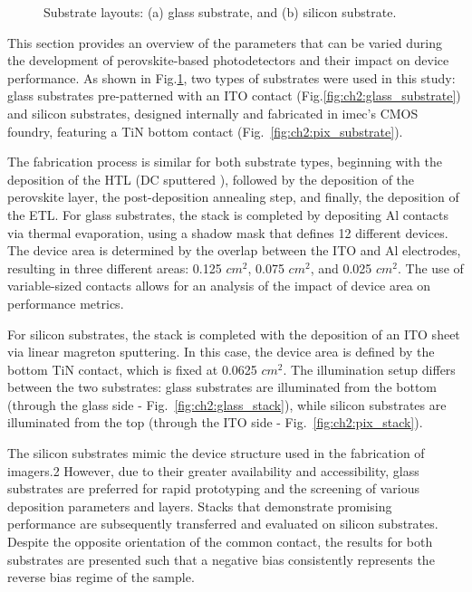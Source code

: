 \begin{figure}[htbp]
    \caption{Substrate layouts: (a) glass substrate, and (b) silicon substrate.}
    \label{fig:ch2:types_of_substrates}
\end{figure}


This section provides an overview of the parameters that can be varied during the development of perovskite-based photodetectors and their impact on device performance. As shown in Fig.\ref{fig:ch2:types_of_substrates}, two types of substrates were used in this study: glass substrates pre-patterned with an ITO contact (Fig.\ref{fig:ch2:glass_substrate}) and silicon substrates, designed internally and fabricated in imec's CMOS foundry, featuring a TiN bottom contact (Fig.~\ref{fig:ch2:pix_substrate}).

The fabrication process is similar for both substrate types, beginning with the deposition of the HTL (DC sputtered ), followed by the deposition of the perovskite layer, the post-deposition annealing step, and finally, the deposition of the ETL. For glass substrates, the stack is completed by depositing Al contacts via thermal evaporation, using a shadow mask that defines 12 different devices. The device area is determined by the overlap between the ITO and Al electrodes, resulting in three different areas: 0.125 $cm^2$, 0.075 $cm^2$, and 0.025 $cm^2$. The use of variable-sized contacts allows for an analysis of the impact of device area on performance metrics.

For silicon substrates, the stack is completed with the deposition of an ITO sheet via linear magreton sputtering. In this case, the device area is defined by the bottom TiN contact, which is fixed at 0.0625 $cm^2$. The illumination setup differs between the two substrates: glass substrates are illuminated from the bottom (through the glass side - Fig.~\ref{fig:ch2:glass_stack}), while silicon substrates are illuminated from the top (through the ITO side - Fig.~\ref{fig:ch2:pix_stack}). 

The silicon substrates mimic the device structure used in the fabrication of imagers.2 However, due to their greater availability and accessibility, glass substrates are preferred for rapid prototyping and the screening of various deposition parameters and layers. Stacks that demonstrate promising performance are subsequently transferred and evaluated on silicon substrates. Despite the opposite orientation of the common contact, the results for both substrates are presented such that a negative bias consistently represents the reverse bias regime of the sample.


